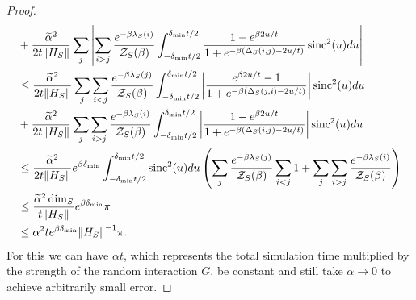 \begin{proof}
\begin{align}
        &+ \frac{\widetilde{\alpha}^2}{2 t \norm{H_S}} \sum_j  \abs{\sum_{i > j} \frac{e^{-\beta \lambda_S(i)}}{\mathcal{Z}_S(\beta)} \int_{-\delta_{\min} t /2 }^{\delta_{\min} t/ 2} \frac{1 - e^{\beta 2 u / t}}{1 + e^{-\beta(\Delta_S(i,j) - 2u/t)}} \operatorname{sinc}^2(u) du} \\
        &\le \frac{\widetilde{\alpha}^2}{2 t \norm{H_S}} \sum_j \sum_{i < j} \frac{e^{-\beta \lambda_S(j)}}{\mathcal{Z}_S(\beta)} \int_{-\delta_{\min} t /2 }^{\delta_{\min} t/ 2}\abs{ \frac{ e^{\beta 2 u / t} - 1}{1 + e^{-\beta(\Delta_S(j, i) - 2u/t)}}} \operatorname{sinc}^2(u) du \nonumber \\
        &+ \frac{\widetilde{\alpha}^2}{2 t \norm{H_S}} \sum_j  \sum_{i > j} \frac{e^{-\beta \lambda_S(i)}}{\mathcal{Z}_S(\beta)} \int_{-\delta_{\min} t /2 }^{\delta_{\min} t/ 2} \abs{ \frac{1 - e^{\beta 2 u / t}}{1 + e^{-\beta(\Delta_S(i,j) - 2u/t)}} } \operatorname{sinc}^2(u) du \\
        &\le \frac{\widetilde{\alpha}^2}{2 t \norm{H_S}} e^{\beta \delta_{\min}} \int_{-\delta_{\min}t/2}^{\delta_{\min}t /2} \operatorname{sinc}^2(u) du \left(\sum_j \frac{e^{-\beta \lambda_S(j)}}{\mathcal{Z}_S(\beta)} \sum_{i < j} 1 + \sum_j \sum_{i > j} \frac{e^{-\beta \lambda_S(i)}}{\mathcal{Z}_S(\beta)}  \right) \\
        &\le \frac{\widetilde{\alpha}^2 \dim_S}{t \norm{H_S}} e^{\beta \delta_{\min}} \pi \\
        &\le \alpha^2 t e^{\beta \delta_{\min}} \norm{H_S}^{-1} \pi.
    \end{align}
    For this we can have $\alpha t$, which represents the total simulation time multiplied by the strength of the random interaction $G$, be constant and still take $\alpha \to 0$ to achieve arbitrarily small error.


\end{proof}
